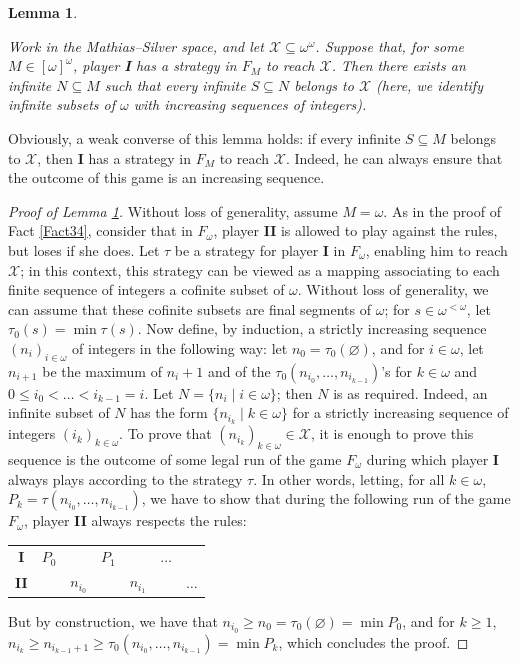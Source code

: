 \documentclass[a4paper,11pt]{article}
\newtheorem{lem}[thm]{Lemma}
\theoremstyle{definition}
\numberwithin{equation}{section}
\newcommand{\X}{\mathcal{X}}
\newcommand{\elinf}{[\omega]^\omega}
\newcommand{\I}{\textbf{I}}
\newcommand{\II}{\textbf{II}}
\begin{document}
\begin{lem}\label{asympexact}

Work in the Mathias--Silver space, and let $\X \subseteq \omega^\omega$. Suppose that, for some $M \in \elinf$, player \I{} has a strategy in $F_M$ to reach $\X$. Then there exists an infinite $N \subseteq M$ such that every infinite $S\subseteq N$ belongs to  $\X$ (here, we identify infinite subsets of $\omega$ with increasing sequences of integers).

\end{lem}

Obviously, a weak converse of this lemma holds: if every infinite $S \subseteq M$ belongs to $\X$, then \I{} has a strategy in $F_M$ to reach $\X$. Indeed, he can always ensure that the outcome of this game is an increasing sequence.

\begin{proof}[Proof of Lemma \ref{asympexact}]

Without loss of generality, assume $M = \omega$. As in the proof of Fact \ref{Fact34}, consider that in $F_\omega$, player \II{} is allowed to play against the rules, but loses if she does. Let $\tau$ be a strategy for player \I{} in $F_\omega$, enabling him to reach $\X$; in this context, this strategy can be viewed as a mapping associating to each finite sequence of integers a cofinite subset of $\omega$. Without loss of generality, we can assume that these cofinite subsets are final segments of $\omega$; for $s \in \omega^{< \omega}$, let $\tau_0(s) = \min \tau(s)$. Now define, by induction, a strictly increasing sequence $(n_i)_{i \in \omega}$ of integers in the following way: let $n_0 = \tau_0(\varnothing)$, and for $i \in \omega$, let $n_{i + 1}$ be the maximum of $n_i + 1$ and of the $\tau_0(n_{i_0}, \ldots, n_{i_{k - 1}})$'s for $k \in \omega$ and $0 \leqslant i_0 < \ldots < i_{k - 1} = i$. Let $N = \{n_i \mid i \in \omega\}$; then $N$ is as required. Indeed, an infinite subset of $N$ has the form $\{n_{i_k} \mid k \in \omega\}$ for a strictly increasing sequence of integers $(i_k)_{k \in \omega}$. To prove that $(n_{i_k})_{k \in \omega} \in \X$, it is enough to prove this sequence is the outcome of some legal run of the game $F_\omega$ during which player \I{} always plays according to the strategy $\tau$. In other words, letting, for all $k \in \omega$, $P_k = \tau(n_{i_0}, \ldots, n_{i_{k - 1}})$, we have to show that during the following run of the game $F_\omega$, player \II{} always respects the rules:

\smallskip

\begin{tabular}{ccccccc}
\textbf{I} & $P_0$ & & $P_1$ & & $\hdots$ & \\
\textbf{II} & & $n_{i_0}$ & & $n_{i_1}$ & & $\hdots$ 
\end{tabular}

\smallskip

\noindent But by construction, we have that $n_{i_0} \geqslant n_0 = \tau_0(\varnothing) = \min P_0$, and for $k \geqslant 1$, $n_{i_k} \geqslant n_{i_{k - 1} + 1} \geqslant \tau_0(n_{i_0}, \ldots, n_{i_{k - 1}}) = \min P_k$, which concludes the proof.

\end{proof}
\end{document}
